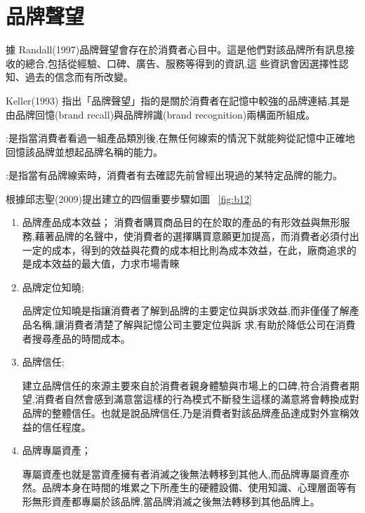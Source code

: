 \section{品牌聲望}
據
Randall(1997)品牌聲望會存在於消費者心目中。這是他們對該品牌所有訊息接收的總合,包括從經驗、口碑、廣告、服務等得到的資訊,這 些資訊會因選擇性認知、過去的信念而有所改變。\cite{Randall1997}

Keller(1993) 指出「品牌聲望」指的是關於消費者在記憶中較強的品牌連結,其是由品牌回憶(brand recall)與品牌辨識(brand recognition)兩構面所組成\cite{Keller1993}。
\begin{enumerate}
:是指當消費者看過一組產品類別後,在無任何線索的情況下就能夠從記憶中正確地回憶該品牌並想起品牌名稱的能力。

:是指當有品牌線索時，消費者有去確認先前曾經出現過的某特定品牌的能力。
\end{enumerate}

根據邱志聖(2009)提出建立的四個重要步驟如圖 ~\ref{fig:b12}
\begin{enumerate}
\item 品牌產品成本效益；
消費者購買商品目的在於取的產品的有形效益與無形服務,藉著品牌的名聲中，使消費者的選擇購買意願更加提高，而消費者必須付出一定的成本，得到的效益與花費的成本相比則為成本效益，在此，廠商追求的是成本效益的最大值，力求市場青睞

\item  品牌定位知曉;

品牌定位知曉是指讓消費者了解到品牌的主要定位與訴求效益,而非僅僅了解產品名稱,讓消費者清楚了解與記憶公司主要定位與訴 求,有助於降低公司在消費者搜尋產品的時間成本。

\item  品牌信任;

建立品牌信任的來源主要來自於消費者親身體驗與市場上的口碑,符合消費者期望,消費者自然會感到滿意當這樣的行為模式不斷發生這樣的滿意將會轉換成對品牌的整體信任。也就是說品牌信任,乃是消費者對該品牌產品達成對外宣稱效益的信任程度。

\item  品牌專屬資產；

專屬資產也就是當資產擁有者消滅之後無法轉移到其他人,而品牌專屬資產亦然。品牌本身在時間的堆累之下所產生的硬體設備、使用知識、心理層面等有形無形資產都專屬於該品牌,當品牌消滅之後無法轉移到其他品牌上。
\end{enumerate}

